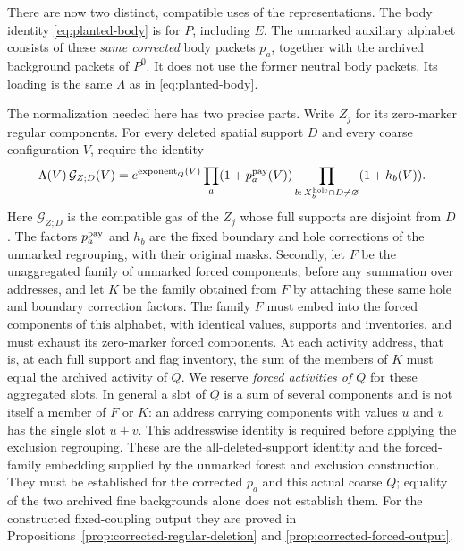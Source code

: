 There are now two distinct, compatible uses of the representations.
The body identity \eqref{eq:planted-body} is for $P$, including $E$.
The unmarked auxiliary alphabet consists of these \emph{same corrected}
body packets $p_a$, together with the archived background packets of $P^0$.
It does not use the former neutral body packets. Its loading is the same
$\Lambda$ as in \eqref{eq:planted-body}.

The normalization needed here has two precise parts. Write $Z_j$ for
its zero-marker regular components. For every deleted spatial support
$D$ and every coarse configuration $V$, require the identity
\begin{equation}\label{eq:planted-holes}
 \Lambda(V)\,\mathcal G_{Z;D}(V)
 =e^{\operatorname{exponent}_Q(V)}
        \prod_a(1+p_a^{\rm pay}(V))
        \prod_{b:\,X_b^{\rm hole}\cap D\ne\varnothing}
                    (1+h_b(V)).
\end{equation}
Here $\mathcal G_{Z;D}$ is the compatible gas of the $Z_j$ whose
full supports are disjoint from $D$. The factors $p_a^{\rm pay}$ and
$h_b$ are the fixed boundary and hole corrections of the unmarked
regrouping, with their original masks. Secondly, let $F$ be the
unaggregated family of unmarked forced components, before any
summation over addresses, and let $K$ be the family obtained from $F$
by attaching these same hole and boundary correction factors. The
family $F$ must embed into the forced components of this alphabet,
with identical values, supports and inventories, and must exhaust its
zero-marker forced components. At each activity address, that is, at
each full support and flag inventory, the sum of the members of $K$
must equal the archived activity of $Q$. We reserve \emph{forced
activities of $Q$} for these aggregated slots. In general a slot of
$Q$ is a sum of several components and is not itself a member of $F$
or $K$: an address carrying components with values $u$ and $v$ has the
single slot $u+v$. This addresswise identity is required before
applying the exclusion regrouping. These are the all-deleted-support
identity and the forced-family embedding supplied by the unmarked
forest and exclusion construction. They must be established for the
corrected $p_a$ and this actual coarse $Q$; equality of the two archived
fine backgrounds alone does not establish them. For the constructed
fixed-coupling output they are proved in
Propositions~\ref{prop:corrected-regular-deletion} and
\ref{prop:corrected-forced-output}.

